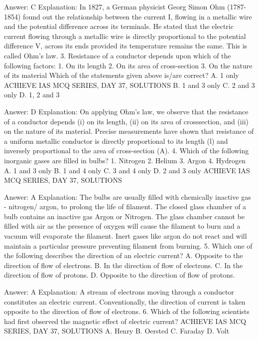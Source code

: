 Answer: C
Explanation: In 1827, a German physicist Georg Simon Ohm (1787- 1854) found out the relationship between the current I, flowing in a metallic wire and the potential difference across its terminals. He stated that the electric current flowing through a metallic wire is directly proportional to the potential difference V, across its ends provided its temperature remains the same. This is called Ohm’s law. 3. Resistance of a conductor depends upon which of the following factors: 1. On its length 2. On its area of cross-section 3. On the nature of its material Which of the statements given above is/are correct? A. 1 only ACHIEVE IAS MCQ SERIES, DAY 37, SOLUTIONS B. 1 and 3 only C. 2 and 3 only D. 1, 2 and 3 

Answer: D
Explanation: On applying Ohm’s law, we observe that the resistance of a conductor depends (i) on its length, (ii) on its area of crosssection, and (iii) on the nature of its material. Precise measurements have shown that resistance of a uniform metallic conductor is directly proportional to its length (l) and inversely proportional to the area of cross-section (A). 4. Which of the following inorganic gases are filled in bulbs? 1. Nitrogen 2. Helium 3. Argon 4. Hydrogen A. 1 and 3 only B. 1 and 4 only C. 3 and 4 only D. 2 and 3 only ACHIEVE IAS MCQ SERIES, DAY 37, SOLUTIONS 

Answer: A
Explanation: The bulbs are usually filled with chemically inactive gas - nitrogen/ argon, to prolong the life of filament. The closed glass chamber of a bulb contains an inactive gas Argon or Nitrogen. The glass chamber cannot be filled with air as the presence of oxygen will cause the filament to burn and a vacuum will evaporate the filament. Inert gases like argon do not react and will maintain a particular pressure preventing filament from burning. 5. Which one of the following describes the direction of an electric current? A. Opposite to the direction of flow of electrons. B. In the direction of flow of electrons. C. In the direction of flow of protons. D. Opposite to the direction of flow of protons. 

Answer: A
Explanation: A stream of electrons moving through a conductor constitutes an electric current. Conventionally, the direction of current is taken opposite to the direction of flow of electrons. 6. Which of the following scientists had first observed the magnetic effect of electric current? ACHIEVE IAS MCQ SERIES, DAY 37, SOLUTIONS A. Henry B. Oersted C. Faraday D. Volt 

